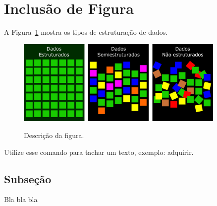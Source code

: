 		\section{Inclusão de Figura}
		\label{sec:figura}
			A Figura~\ref{fig:identificador_da_figura} mostra os tipos de estruturação de dados.
			\begin{figure}[!ht]
				{\centering
					\caption{Descrição da figura.}
					\includegraphics[width=0.9\textwidth]{figuras/dados.png}
					\label{fig:identificador_da_figura}
				} 		
			\end{figure}


		Utilize esse comando para tachar um texto, exemplo: adquirir.
		\subsection{Subseção}
		\label{subsec:subseçao}
			Bla bla bla
